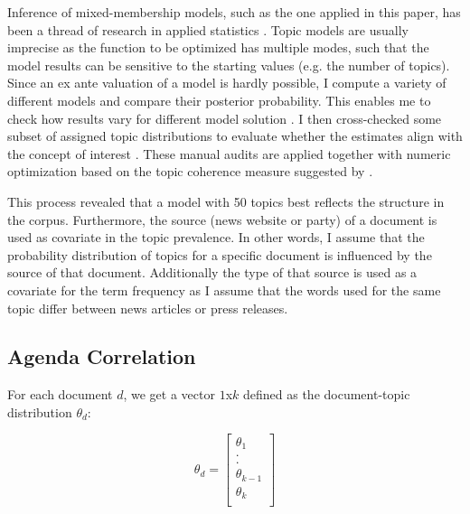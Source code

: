 \documentclass[12pt,a4paper,notitlepage]{article}
\begin{document}
Inference of mixed-membership models, such as the one applied in this paper, has been a thread of research in applied statistics \citep{blei_latent_2003, erosheva_mixed-membership_2004, braun_variational_2010}. Topic models are usually imprecise as the function to be optimized has multiple modes, such that the model results can be sensitive to the starting values (e.g. the number of topics). Since an ex ante valuation of a model is hardly possible, I compute a variety of different models and compare their posterior probability. This enables me to check how results vary for different model solution \citep{roberts_navigating_2016}. I then cross-checked some subset of assigned topic distributions to evaluate whether the estimates align with the concept of interest \citep{gentzkow_text_2017}. These manual audits are applied together with numeric optimization based on the topic coherence measure suggested by \citet{mimno_optimizing_2011}. 

This process revealed that a model with 50 topics best reflects the structure in the corpus. Furthermore, the source (news website or party) of a document is used as covariate in the topic prevalence. In other words, I assume that the probability distribution of topics for a specific document is influenced by the source of that document. Additionally the type of that source is used as a covariate for the term frequency as I assume that the words used for the same topic differ between news articles or press releases.  

\subsection{Agenda Correlation}\label{ch_agendacorrl}

For each document $d$, we get a vector $1$x$k$ defined as the document-topic distribution $\theta_{d}$:

\begin{equation}
	\theta_{d} =
	\begin{bmatrix} 
	\theta_{1} \\
	. \\
	. \\
	\theta_{k-1} \\
	\theta_{k}\\
	\end{bmatrix}
\end{equation} 
 
\end{document}
